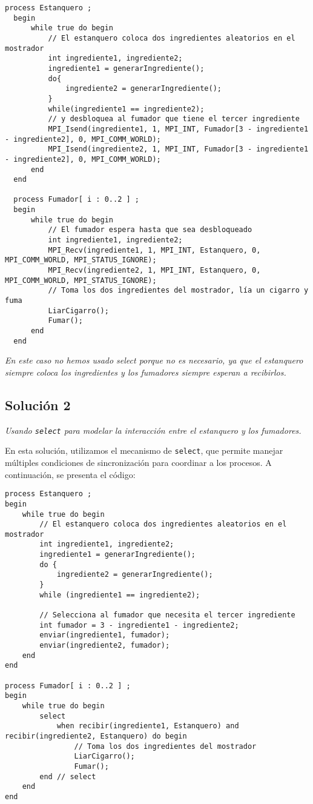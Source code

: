 \documentclass[a4paper,12pt]{article}
\begin{document}
\begin{lstlisting}[style=customcpp]
  process Estanquero ;
  begin
      while true do begin
          // El estanquero coloca dos ingredientes aleatorios en el mostrador
          int ingrediente1, ingrediente2;
          ingrediente1 = generarIngrediente();
          do{
              ingrediente2 = generarIngrediente();
          }
          while(ingrediente1 == ingrediente2);
          // y desbloquea al fumador que tiene el tercer ingrediente
          MPI_Isend(ingrediente1, 1, MPI_INT, Fumador[3 - ingrediente1 - ingrediente2], 0, MPI_COMM_WORLD);
          MPI_Isend(ingrediente2, 1, MPI_INT, Fumador[3 - ingrediente1 - ingrediente2], 0, MPI_COMM_WORLD);
      end
  end
  
  process Fumador[ i : 0..2 ] ;
  begin
      while true do begin
          // El fumador espera hasta que sea desbloqueado
          int ingrediente1, ingrediente2;
          MPI_Recv(ingrediente1, 1, MPI_INT, Estanquero, 0, MPI_COMM_WORLD, MPI_STATUS_IGNORE);
          MPI_Recv(ingrediente2, 1, MPI_INT, Estanquero, 0, MPI_COMM_WORLD, MPI_STATUS_IGNORE);
          // Toma los dos ingredientes del mostrador, lía un cigarro y fuma
          LiarCigarro();
          Fumar();
      end
  end
\end{lstlisting}

\textit{En este caso no hemos usado select porque no es necesario, ya que el estanquero siempre coloca los ingredientes y los fumadores siempre esperan a recibirlos.}

\subsection{Solución 2}

\textit{Usando \texttt{select} para modelar la interacción entre el estanquero y los fumadores.}

En esta solución, utilizamos el mecanismo de \texttt{select}, que permite manejar múltiples condiciones de sincronización para coordinar a los procesos. A continuación, se presenta el código:

\begin{lstlisting}[style=customcpp]
process Estanquero ;
begin
    while true do begin
        // El estanquero coloca dos ingredientes aleatorios en el mostrador
        int ingrediente1, ingrediente2;
        ingrediente1 = generarIngrediente();
        do {
            ingrediente2 = generarIngrediente();
        }
        while (ingrediente1 == ingrediente2);
        
        // Selecciona al fumador que necesita el tercer ingrediente
        int fumador = 3 - ingrediente1 - ingrediente2;
        enviar(ingrediente1, fumador);
        enviar(ingrediente2, fumador);
    end
end

process Fumador[ i : 0..2 ] ;
begin
    while true do begin
        select 
            when recibir(ingrediente1, Estanquero) and  recibir(ingrediente2, Estanquero) do begin
                // Toma los dos ingredientes del mostrador
                LiarCigarro();
                Fumar();
        end // select
    end
end
\end{lstlisting}
\end{document}
